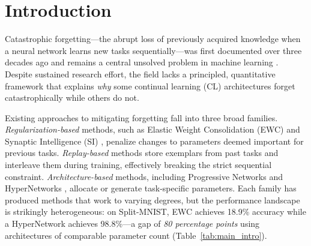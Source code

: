 \documentclass{article}
\begin{document}
\section{Introduction}
\label{sec:intro}

Catastrophic forgetting---the abrupt loss of previously acquired knowledge when a neural network learns new tasks sequentially---was first documented over three decades ago \citep{mccloskey1989catastrophic} and remains a central unsolved problem in machine learning \citep{french1999catastrophic}. Despite sustained research effort, the field lacks a principled, quantitative framework that explains \emph{why} some continual learning (CL) architectures forget catastrophically while others do not.

Existing approaches to mitigating forgetting fall into three broad families. \emph{Regularization-based} methods, such as Elastic Weight Consolidation (EWC) \citep{kirkpatrick2017overcoming} and Synaptic Intelligence (SI) \citep{zenke2017continual}, penalize changes to parameters deemed important for previous tasks. \emph{Replay-based} methods store exemplars from past tasks and interleave them during training, effectively breaking the strict sequential constraint. \emph{Architecture-based} methods, including Progressive Networks \citep{rusu2016progressive} and HyperNetworks \citep{von2019continual, ehret2021continual}, allocate or generate task-specific parameters. Each family has produced methods that work to varying degrees, but the performance landscape is strikingly heterogeneous: on Split-MNIST, EWC achieves 18.9\% accuracy while a HyperNetwork achieves 98.8\%---a gap of \emph{80 percentage points} using architectures of comparable parameter count (Table~\ref{tab:main_intro}).
\end{document}
